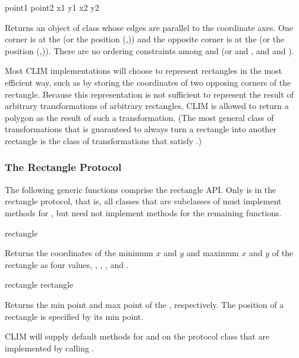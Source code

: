   {point1 point2}
 {x1 y1 x2 y2}

Returns an object of class  whose edges are parallel to
the coordinate axes.  One corner is at the   (or the
position (,)) and the opposite corner is at the 
 (or the position (,)).  There are no ordering
constraints among  and  (or  and , and
 and ).

Most CLIM implementations will choose to represent rectangles in the most
efficient way, such as by storing the coordinates of two opposing corners of the
rectangle.  Because this representation is not sufficient to represent the
result of arbitrary transformations of arbitrary rectangles, CLIM is allowed to
return a polygon as the result of such a transformation.  (The most general
class of transformations that is guaranteed to always turn a rectangle into
another rectangle is the class of transformations that satisfy
.)

\MayCaptureInputs


\subsubsection {The Rectangle Protocol}

The following generic functions comprise the rectangle API.  Only
 is in the rectangle protocol, that is, all classes that
are subclasses of  must implement methods for
, but need not implement methods for the remaining
functions.

 {rectangle}

Returns the coordinates of the minimum $x$ and $y$ and maximum $x$ and $y$ of
the rectangle  as four values, , ,
, and .

 {rectangle}
 {rectangle}

Returns the min point and max point of the  ,
respectively.  The position of a rectangle is specified by its min point.

CLIM will supply default methods for  and
 on the protocol class  that are
implemented by calling .



